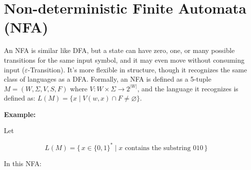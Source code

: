 \documentclass[12pt,a4paper,openany]{article}
\begin{document}
\section{Non-deterministic Finite Automata (NFA)}

An NFA is similar like DFA, but a state can have zero, one, or many possible transitions for the same input symbol, and it may even move without consuming input ($\varepsilon$-Transition). 
It’s more flexible in structure, though it recognizes the same class of languages as a DFA. 
Formally, an NFA is defined as a 5-tuple $M = (W, \Sigma, V, S, F)$ where $V: W \times \Sigma \to 2^{|W|}$, and the language it recognizes is defined as: $L(M)= \{x \mid V(w, x) \cap F \neq \varnothing\}.$


\textbf{Example:} 

Let 

\[
L(M) = \{\, x \in \{0,1\}^* \mid x \text{ contains the substring } 010 \,\}
\]

\begin{center}
\end {center}


In this NFA: 
\end{document}
